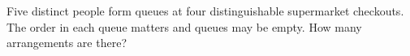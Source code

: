 Five distinct people form queues at four distinguishable supermarket checkouts. The order in each queue matters and queues may be empty. How many arrangements are there?
